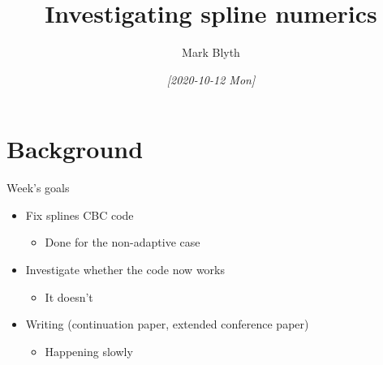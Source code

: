 \documentclass[presentation]{beamer}
\author{Mark Blyth}
\date{\textit{[2020-10-12 Mon]}}
\title{Investigating spline numerics}
\begin{document}
\maketitle

\section{Background}
\label{sec:org52536e7}
\begin{frame}[label={sec:orgb754af8}]{Week's goals}
\begin{itemize}
\item Fix splines CBC code
\begin{itemize}
\item Done for the non-adaptive case
\end{itemize}
\end{itemize}
\vfill
\begin{itemize}
\item Investigate whether the code now works
\begin{itemize}
\item It doesn't
\end{itemize}
\end{itemize}
\vfill
\begin{itemize}
\item Writing (continuation paper, extended conference paper)
\begin{itemize}
\item Happening slowly
\end{itemize}
\end{itemize}
\end{frame}
\end{document}

